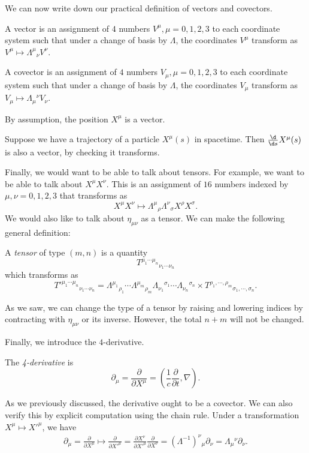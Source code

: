 \documentclass[a4paper]{article}
\begin{document}
We can now write down our practical definition of vectors and covectors.
\begin{defi}
  A vector is an assignment of $4$ numbers $V^\mu, \mu = 0, 1, 2, 3$ to each coordinate system such that under a change of basis by $\Lambda$, the coordinates $V^\mu$ transform as $V^\mu \mapsto \Lambda^\mu\!_\nu V^\nu$.

  A covector is an assignment of $4$ numbers $V_\mu, \mu = 0, 1, 2, 3$ to each coordinate system such that under a change of basis by $\Lambda$, the coordinates $V_\mu$ transform as $V_\mu \mapsto \Lambda_\mu\!^\nu V_\nu$.
\end{defi}

\begin{eg}
  By assumption, the position $X^\mu$ is a vector.
\end{eg}

\begin{eg}
  Suppose we have a trajectory of a particle $X^\mu(s)$ in spacetime. Then $\frac{\d}{\d s} X^\mu(s)$ is also a vector, by checking it transforms.
\end{eg}

Finally, we would want to be able to talk about tensors. For example, we want to be able to talk about $X^\mu X^\nu$. This is an assignment of $16$ numbers indexed by $\mu, \nu = 0, 1, 2, 3$ that transforms as
\[
  X^\mu X^\nu \mapsto \Lambda^\mu\!_\rho \Lambda^\nu\!_\sigma X^\rho X^\sigma.
\]
We would also like to talk about $\eta_{\mu\nu}$ as a tensor. We can make the following general definition:

\begin{defi}[Tensor]
  A \emph{tensor} of type $(m, n)$ is a quantity
  \[
    T^{\mu_1\cdots \mu_n}\!_{\nu_1\cdots \nu_n}
  \]
  which transforms as
  \[
    T'^{\mu_1\cdots \mu_n}\!_{\nu_1\cdots \nu_n} = \Lambda^{\mu_1}\!_{\rho_1} \cdots \Lambda^{\mu_m}\!_{\rho_m}\Lambda_{\nu_1}\!^{\sigma_1}\cdots\Lambda_{\nu_n}\!^{\sigma_n} \times T^{\rho_1, \cdots, \rho_m}\!_{\sigma_1, \cdots, \sigma_n}.
  \]
\end{defi}
As we saw, we can change the type of a tensor by raising and lowering indices by contracting with $\eta_{\mu\nu}$ or its inverse. However, the total $n + m$ will not be changed.

Finally, we introduce the $4$-derivative.
\begin{defi}[4-derivative]
  The \emph{4-derivative} is
  \[
    \partial_\mu = \frac{\partial}{\partial X^\mu} = \left(\frac{1}{c}\frac{\partial}{\partial t}, \nabla\right).
  \]
\end{defi}
As we previously discussed, the derivative ought to be a covector. We can also verify this by explicit computation using the chain rule. Under a transformation $X^\mu \mapsto X'^\mu$, we have
\begin{align*}
  \partial_\mu = \frac{\partial}{\partial X^\mu} \mapsto \frac{\partial}{\partial X'^\mu} = \frac{\partial X^\nu}{\partial X'^\mu}\frac{\partial}{\partial X^\nu} = (\Lambda^{-1})^\nu\!_\mu\partial_\nu = \Lambda_\mu\!^\nu \partial_\nu.
\end{align*}
\end{document}
